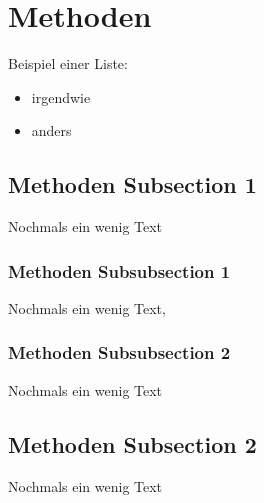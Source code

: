 
\section{Methoden}

Beispiel einer Liste:

\begin{itemize} 
	\item irgendwie 
	\item anders
\end{itemize}


\subsection{Methoden Subsection 1}
Nochmals ein wenig Text

\subsubsection{Methoden Subsubsection 1}
Nochmals ein wenig Text‚

\subsubsection{Methoden Subsubsection 2}
Nochmals ein wenig Text

\subsection{Methoden Subsection 2}
Nochmals ein wenig Text